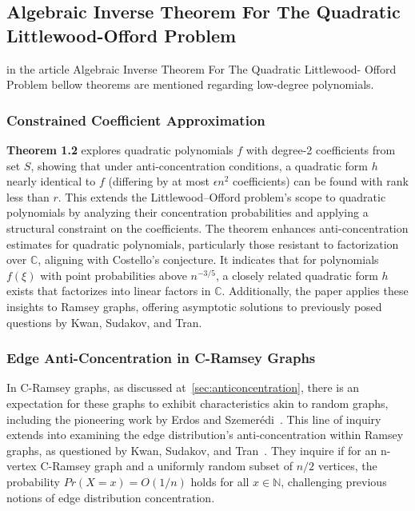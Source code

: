 
\subsection{Algebraic Inverse Theorem For The Quadratic Littlewood-Offord Problem}
in the article Algebraic Inverse Theorem For The Quadratic Littlewood-
Offord Problem \cite{kwan2019algebraic} bellow theorems are mentioned regarding low-degree polynomials.

\subsubsection{Constrained Coefficient Approximation}
\textbf{Theorem 1.2} explores quadratic polynomials ${f}$ with degree-2 coefficients 
from set $S$, showing that under anti-concentration conditions, a quadratic form $h$ 
nearly identical to ${f}$ (differing by at most $\epsilon n^2$ coefficients) can be 
found with rank less than $r$. This extends the Littlewood–Offord problem's scope to quadratic polynomials by analyzing their concentration probabilities and applying a structural constraint on the coefficients. The theorem enhances anti-concentration estimates for quadratic polynomials, particularly those resistant to factorization over $\mathbb{C}$, aligning with Costello's conjecture. It indicates that for polynomials $f(\xi)$ with point probabilities above $n^{-3/5}$, a closely related quadratic form $h$ exists that factorizes into linear factors in $\mathbb{C}$. Additionally, the paper applies these insights to Ramsey graphs, offering asymptotic solutions to previously posed questions by Kwan, Sudakov, and Tran.


\subsubsection{Edge Anti-Concentration in C-Ramsey Graphs}
In C-Ramsey graphs, as discussed at~\ref{sec:anticoncentration}, 
there is an expectation for these graphs to exhibit characteristics akin to random graphs,
including the pioneering work by Erdos and Szemerédi~\cite{erdHos1972ramsey}.
This line of inquiry extends into examining the edge distribution's anti-concentration
within Ramsey graphs, as questioned by Kwan, Sudakov, and Tran~\cite{kwan2019anticoncentration}.
They inquire if for an n-vertex C-Ramsey graph and a uniformly random subset of
$n/2$ vertices, the probability $Pr(X=x)=O(1/n)$ holds for all $x \in \mathbb{N}$,
challenging previous notions of edge distribution concentration.

